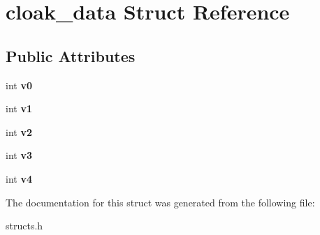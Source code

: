 \hypertarget{structcloak__data}{\section{cloak\-\_\-data Struct Reference}
\label{structcloak__data}
}
\subsection*{Public Attributes}
\begin{DoxyCompactItemize}
\item 
\hypertarget{structcloak__data_ac03f2d5a6d39bf86536510bf281ab290}{int {\bfseries v0}}\label{structcloak__data_ac03f2d5a6d39bf86536510bf281ab290}

\item 
\hypertarget{structcloak__data_aa14643185983f41355d57b0b9f4f8d46}{int {\bfseries v1}}\label{structcloak__data_aa14643185983f41355d57b0b9f4f8d46}

\item 
\hypertarget{structcloak__data_aa5e54b5d7071e02a581624202be18133}{int {\bfseries v2}}\label{structcloak__data_aa5e54b5d7071e02a581624202be18133}

\item 
\hypertarget{structcloak__data_ac95cd6f056c8c9fb82a8bbc8fae85e99}{int {\bfseries v3}}\label{structcloak__data_ac95cd6f056c8c9fb82a8bbc8fae85e99}

\item 
\hypertarget{structcloak__data_a426344db5e5d372d8f0d70269ed6faad}{int {\bfseries v4}}\label{structcloak__data_a426344db5e5d372d8f0d70269ed6faad}

\end{DoxyCompactItemize}


The documentation for this struct was generated from the following file\-:\begin{DoxyCompactItemize}
\item 
structs.\-h\end{DoxyCompactItemize}
